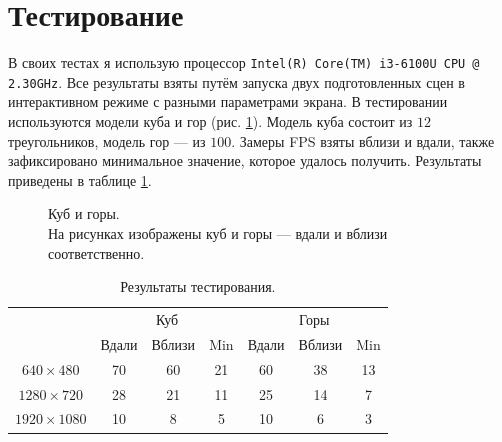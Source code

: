 \documentclass{article}
\begin{document}
\newpage

\section{Тестирование}

В своих тестах я использую процессор \verb"Intel(R) Core(TM) i3-6100U CPU @ 2.30GHz".
Все результаты взяты путём запуска двух подготовленных сцен в интерактивном режиме с разными параметрами экрана.
В тестировании используются модели куба и гор (рис. \ref{rendered models}).
Модель куба состоит из $12$ треугольников, модель гор --- из $100$.
Замеры FPS взяты вблизи и вдали, также зафиксировано минимальное значение, которое удалось получить.
Результаты приведены в таблице \ref{testing results}.

\begin{figure}[ht]
    \caption{Куб и горы. \\ На рисунках изображены куб и горы --- вдали и вблизи соответственно. }
    \label{rendered models}
\end{figure}

\begin{table}[ht]
	\begin{center}
	\begin{tabular}{|c|c|c|c|c|c|c|} \cline{2-7}
		\multicolumn{1}{c|}{} & \multicolumn{3}{|c|}{Куб} & \multicolumn{3}{|c|}{Горы} \\ \cline{2-7}
		\multicolumn{1}{c|}{} & Вдали & Вблизи & Min & Вдали & Вблизи & Min \\ \hline
		$640 \times 480$ & 70 & 60 & 21 & 60 & 38 & 13 \\ \hline
		$1280 \times 720$ & 28 & 21 & 11 & 25 & 14 & 7 \\ \hline
		$1920 \times 1080$ & 10 & 8 & 5 & 10 & 6 & 3 \\ \hline
	\end{tabular}
	\end{center}
	\caption{Результаты тестирования.}
	\label{testing results}
\end{table}
\end{document}
